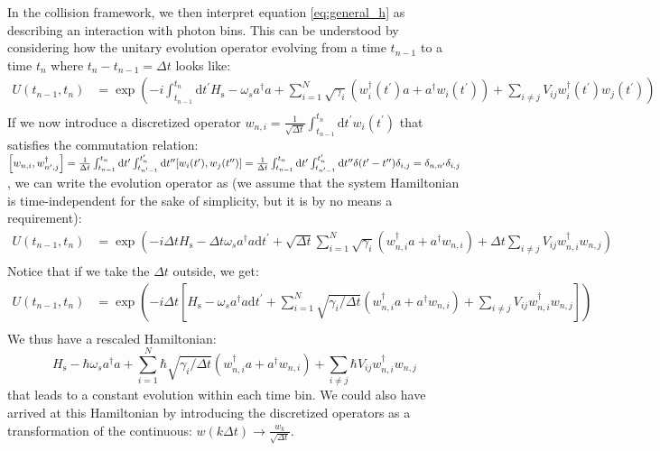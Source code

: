In the collision framework, we then interpret equation \eqref{eq:general_h} as describing an interaction with photon bins. This can be understood by considering how the unitary evolution operator evolving from a time $t_{n-1}$ to a time $t_n$ where $t_n - t_{n-1} = \Delta t$ looks like:
\begin{align}
    U(t_{n-1},t_n) &= \exp \left (-i \int_{t_{n-1}}^{t_n} \mathrm{d}t^\prime H_{\mathrm{s}}-\omega_s a^\dagger a+\sum_{i=1}^N \sqrt{\gamma_i} \left(w_{i}^{\dagger}(t^\prime) a+a^{\dagger} w_{i}(t^\prime)\right) + \sum_{i \neq j} V_{i j} w_{i}^{\dagger}(t^\prime) w_{j}(t^\prime) \right ) \\
    &
\end{align}
If we now introduce a discretized operator $w_{n,i} = \frac{1}{\sqrt{\Delta t}} \int_{t_{n-1}}^{t_n} \mathrm{d}t^\prime w_{i}(t^\prime)$ that satisfies the commutation relation: $\comm{w_{n,i}}{w_{n^\prime,j}^\dagger} =  \frac{1}{\Delta t} \int_{t_{n-1}}^{t_n} \mathrm{d}t^\prime \int_{t_{n^\prime-1}}^{t_n^\prime} \mathrm{d}t^{\prime \prime} \comm{w_i(t^\prime)}{w_j(t^{\prime \prime})} =  \frac{1}{\Delta t} \int_{t_{n-1}}^{t_n} \mathrm{d}t^\prime \int_{t_{n^\prime-1}}^{t_n^\prime} \mathrm{d}t^{\prime \prime} \delta(t^\prime - t^{\prime \prime}) \delta_{i,j} = \delta_{n,n^\prime} \delta_{i,j}$, we can write the evolution operator as (we assume that the system Hamiltonian is time-independent for the sake of simplicity, but it is by no means a requirement):
\begin{align}
    U(t_{n-1},t_n) &= \exp \left (-i \Delta t H_{\mathrm{s}}-\Delta t \omega_s a^\dagger a\mathrm{d}t^\prime + \sqrt{\Delta t} \sum_{i=1}^N \sqrt{\gamma_i} \left(w_{n,i}^{\dagger} a+a^{\dagger} w_{n,i} \right) + \Delta t \sum_{i \neq j} V_{i j} w_{n,i}^{\dagger} w_{n,j} \right ) \\
\end{align}
Notice that if we take the $\Delta t$ outside, we get:
\begin{align}
    U(t_{n-1},t_n) &= \exp \left (-i \Delta t \left [ H_{\mathrm{s}}- \omega_s a^\dagger a\mathrm{d}t^\prime + \sum_{i=1}^N \sqrt{\gamma_i/\Delta t} \left(w_{n,i}^{\dagger} a+a^{\dagger} w_{n,i} \right) + \sum_{i \neq j} V_{i j} w_{n,i}^{\dagger} w_{n,j} \right ] \right ) \\
\end{align}
We thus have a rescaled Hamiltonian:
\begin{equation}
    H_{\mathrm{s}}- \hbar \omega_s a^\dagger a  + \sum_{i=1}^N \hbar 
 \sqrt{\gamma_i/\Delta t} \left(w_{n,i}^{\dagger} a+a^{\dagger} w_{n,i} \right) + \sum_{i \neq j}\hbar  V_{i j} w_{n,i}^{\dagger} w_{n,j}
\end{equation}
that leads to a constant evolution within each time bin. We could also have arrived at this Hamiltonian by introducing the discretized operators as  a transformation of the continuous: $w(k \Delta t) \rightarrow  \frac{w_k}{\sqrt{\Delta t}}$.


